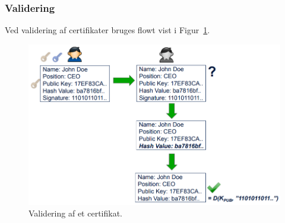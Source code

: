 \subsubsection{Validering}
Ved validering af certifikater bruges flowt vist i Figur~\ref{fig:cert-validate}.

\begin{figure}[H]
	\centering
	\includegraphics[width=0.85\linewidth]{figs/spm4/cert-validate}
	\caption{Validering af et certifikat.}
	\label{fig:cert-validate}
\end{figure}

